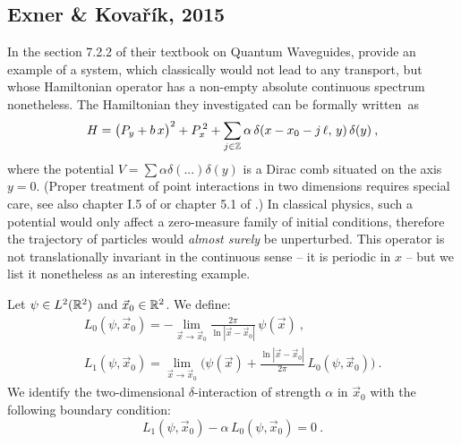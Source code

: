 
\subsection{Exner \& Kovařík, 2015}
In the section 7.2.2 of their textbook on Quantum Waveguides, \citet{ExnerKovarik2015} provide an example of a system, which classically would not lead to any transport, but whose Hamiltonian operator has a non-empty absolute continuous spectrum nonetheless. The Hamiltonian they investigated can be formally written~as
\begin{equation*}
    H
    = \big(P_y + b \, x \big)^2
    + P_x^{\,2}
    + \sum_{j\in\mathbb{Z}} \alpha \, \delta(x - x_0 - j \, \ell, \, y) \, \delta(y)
    \: ,
\end{equation*}
where the potential $V = \sum\alpha\delta(...)\delta(y)$ is a Dirac comb situated on the axis $y=0$. (Proper treatment of point interactions in two dimensions requires special care, see also chapter I.5 of \citet{Albeverio2005} or chapter 5.1 of \citet{ExnerKovarik2015}.) In classical physics, such a potential would only affect a zero-measure family of initial conditions, therefore the trajectory of particles would \textit{almost surely} be unperturbed. This operator is not translationally invariant in the continuous sense – it is periodic in $x$ – but we list it nonetheless as an interesting example.
\begin{defn}
    Let $\psi \in L^2(\mathbb{R}^2)$ and $\vec x_0 \in \mathbb{R}^2$. We define:
    \begin{gather*}
        L_0(\psi, \vec x_0)
        = - \lim_{\vec x \to \vec x_0}
        \frac{2\pi}{\ln| \vec x - \vec x_0 |} \,
        \psi(\vec x)
        \: ,
        \\[7pt]
        L_1(\psi, \vec x_0)
        = \lim_{\vec x \to \vec x_0}
        \Big(
            \psi(\vec x) +
            \frac{\ln| \vec x - \vec x_0 |}{2\pi} \,
            L_0(\psi, \vec x_0)
        \Big)
        \: .
    \end{gather*}
    We identify the two-dimensional $\delta$-interaction of strength $\alpha$ in $\vec x_0$ with the following boundary condition:
    \begin{equation*}
        L_1(\psi, \vec x_0) - \alpha \, L_0(\psi, \vec x_0) = 0
        \: .
    \end{equation*}
\end{defn}
